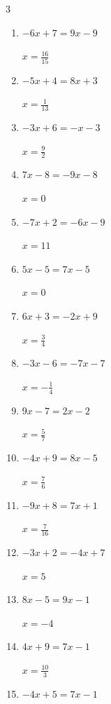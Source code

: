\begin{multicols}{3}
\begin{enumerate}
  \item $-6x+7=9x-9$

        $\displaystyle x=\frac{16}{15}$

  \item $-5x+4=8x+3$

        $\displaystyle x=\frac{1}{13}$

  \item $-3x+6=-x-3$

        $\displaystyle x=\frac{9}{2}$

  \item $7x-8=-9x-8$

        $\displaystyle x=0$

  \item $-7x+2=-6x-9$

        $\displaystyle x=11$

  \item $5x-5=7x-5$

        $\displaystyle x=0$

  \item $6x+3=-2x+9$

        $\displaystyle x=\frac{3}{4}$

  \item $-3x-6=-7x-7$

        $\displaystyle x=-\frac{1}{4}$

  \item $9x-7=2x-2$

        $\displaystyle x=\frac{5}{7}$

  \item $-4x+9=8x-5$

        $\displaystyle x=\frac{7}{6}$

  \item $-9x+8=7x+1$

        $\displaystyle x=\frac{7}{16}$

  \item $-3x+2=-4x+7$

        $\displaystyle x=5$

\columnbreak %

  \item $8x-5=9x-1$

        $\displaystyle x=-4$

  \item $4x+9=7x-1$

        $\displaystyle x=\frac{10}{3}$

  \item $-4x+5=7x-1$


\end{enumerate}
\end{multicols}
